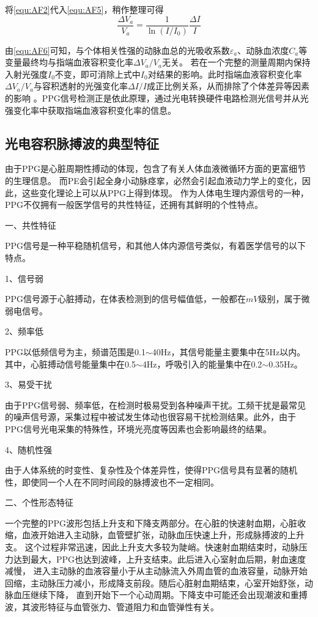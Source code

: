 将\autoref{equ:AF2}代入\autoref{equ:AF5}，稍作整理可得
\begin{equation}
    \label{equ:AF6}
    \frac{\Delta V_{a}}{V_{a}}=\frac{1}{\ln(I/I_{0})}\frac{\Delta I}{I}
\end{equation}

由\autoref{equ:AF6}可知，与个体相关性强的动脉血总的光吸收系数$\varepsilon _{a}$、动脉血浓度$C_{a}$等变量最终均与指端血液容积变化率$\Delta V_{a}/{V_{a}}$无关。
若在一个完整的测量周期内保持入射光强度$I_{0}$不变，即可消除上式中$I_{0}$对结果的影响。此时指端血液容积变化率$\Delta V_{a}/{V_{a}}$与容积透射的光强变化率$\Delta I/I$成正比例关系，从而排除了个体差异等因素的影响
\cite{1980Spectrophotometric,4122392,PPGYY}。PPG信号检测正是依此原理，通过光电转换硬件电路检测光信号并从光强变化率中获取指端血液容积变化率的信息。

\subsection{光电容积脉搏波的典型特征}
由于PPG是心脏周期性搏动的体现，包含了有关人体血液微循环方面的更富细节的生理信息\cite{PPGYY}。
而PE会引起全身小动脉痉挛，必然会引起血液动力学上的变化，因此，这些变化理论上可以从PPG上得到体现。
作为人体电生理内源信号的一种，PPG不仅拥有一般医学信号的共性特征，还拥有其鲜明的个性特点。

一、共性特征

PPG信号是一种平稳随机信号，和其他人体内源信号类似，有着医学信号的以下特点\cite{Qiu2012,Naraharisetti2011,Miao2020,LMX2017}。

1、信号弱

PPG信号源于心脏搏动，在体表检测到的信号幅值低，一般都在$mV$级别，属于微弱电信号。

2、频率低

PPG以低频信号为主，频谱范围是0.1$\sim$40Hz，其信号能量主要集中在5Hz以内。其中，心脏搏动信号能量集中在0.5$\sim$4Hz，呼吸引入的能量集中在0.2$\sim$0.35Hz。

3、易受干扰

由于PPG信号弱、频率低，在检测时极易受到各种噪声干扰。工频干扰是最常见的噪声信号源，采集过程中被试发生体动也很容易干扰检测结果。此外，由于PPG信号光电采集的特殊性，环境光亮度等因素也会影响最终的结果。

4、随机性强

由于人体系统的时变性、复杂性及个体差异性，使得PPG信号具有显著的随机性，即使同一个人在不同时间段的脉搏波也不一定相同。

二、个性形态特征

一个完整的PPG波形包括上升支和下降支两部分。在心脏的快速射血期，心脏收缩，血液开始进入主动脉，血管壁扩张，动脉血压快速上升，形成脉搏波的上升支。
这个过程非常迅速，因此上升支大多较为陡峭。快速射血期结束时，动脉压力达到最大，PPG也达到波峰，上升支结束。此后进入心室射血后期，射血速度减慢，
进入主动脉的血液容量小于从主动脉流入外周血管的血液容量，动脉开始回缩，主动脉压力减小，形成降支前段。随后心脏射血期结束，心室开始舒张，动脉血压继续下降，
直到开始下一个心动周期。下降支中可能还会出现潮波和重搏波，其波形特征与血管张力、管道阻力和血管弹性有关\cite{PPGYY}。

